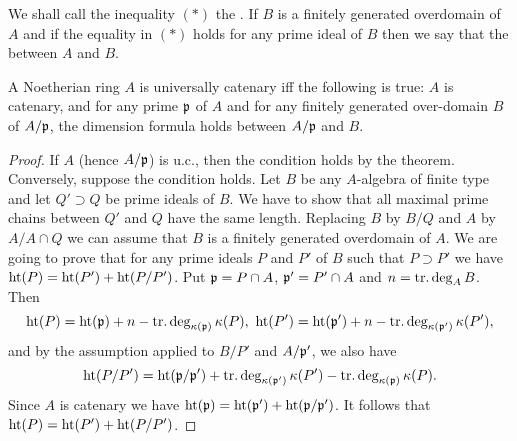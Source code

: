 \documentclass[../main]{subfiles}
\begin{document}
\begin{definition}
We shall call the inequality $(*)$ the . If $B$ is a finitely generated overdomain of $A$ and if the equality in $(*)$ holds for any prime ideal of $B$ then we say that the  between $A$ and $B$.
\end{definition}

\begin{parcorollary}\label{cor:14.02}
A Noetherian ring $A$ is universally catenary iff the following is true: $A$ is catenary, and for any prime $\mathfrak{p}$ of $A$ and for any finitely generated over-domain $B$ of $A / \mathfrak{p}$, the dimension formula holds between $A / \mathfrak{p}$ and $B$.
\end{parcorollary} 

\begin{proof}
If $A$ (hence $A /\mathfrak{p}$) is u.c., then the condition holds by the theorem. Conversely, suppose the condition holds. Let $B$ be any $A$-algebra of finite type and let $Q'\supset Q$ be prime ideals of $B$. We have to show that all maximal prime chains between $Q'$ and $Q$ have the same length. Replacing $B$ by $B/Q$ and $A$ by $A/A\cap Q$ we can assume that $B$ is a finitely generated overdomain of $A$. We are going to prove that for any prime ideals $P$ and $P'$ of $B$ such that $P \supset P'$ we have $\operatorname{ht}(P)=\operatorname{ht}(P')+\operatorname{ht}(P/P')$. Put $\mathfrak{p}=P\cap A$, $\mathfrak{p}'=P'\cap A$ and $n=\operatorname{tr. deg}_AB$. Then \[\operatorname{ht}(P)=\operatorname{ht}(\mathfrak{p})+n-\operatorname{tr. deg}_{\kappa(\mathfrak{p})}\kappa(P),\,\, \operatorname{ht}(P')=\operatorname{ht}(\mathfrak{p}')+n-\operatorname{tr. deg}_{\kappa(\mathfrak{p}')}\kappa(P'),\] and by the assumption applied to $B/P'$ and $A / \mathfrak{p}'$, we also have \[\operatorname{ht}(P / P')=\operatorname{ht}(\mathfrak{p}/\mathfrak{p}')+\operatorname{tr. deg}_{\kappa(\mathfrak{p}')}\kappa(P')-\operatorname{tr. deg}_{\kappa(\mathfrak{p})}\kappa(P).\] Since $A$ is catenary we have $\operatorname{ht}(\mathfrak{p})=\operatorname{ht}(\mathfrak{p}')+\operatorname{ht}(\mathfrak{p} / \mathfrak{p}')$. It follows that \newline $\operatorname{ht}(P)=\operatorname{ht}(P')+\operatorname{ht}(P / P')$.
\end{proof}
\end{document}
